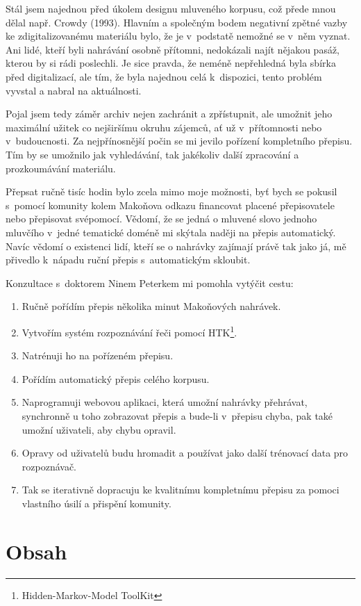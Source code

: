 Stál jsem najednou před úkolem designu mluveného korpusu, což přede mnou dělal
např. Crowdy (1993)\cite{crowdy1993spoken}.
Hlavním a společným bodem negativní zpětné vazby ke zdigitalizovanému materiálu
bylo, že je v~podstatě nemožné se v~něm vyznat. Ani lidé, kteří byli nahrávání
osobně přítomni, nedokázali najít nějakou pasáž, kterou by si rádi poslechli. Je
sice pravda, že neméně nepřehledná byla sbírka před digitalizací, ale tím, že
byla najednou celá k~dispozici, tento problém vyvstal a nabral na aktuálnosti.

Pojal jsem tedy záměr archiv nejen zachránit a zpřístupnit, ale umožnit jeho
maximální užitek co nejširšímu okruhu zájemců, ať už v~přítomnosti nebo
v~budoucnosti. Za nejpřínosnější počin se mi jevilo pořízení kompletního
přepisu. Tím by se umožnilo jak vyhledávání, tak jakékoliv další zpracování a
prozkoumávání materiálu.

Přepsat ručně tisíc hodin bylo zcela mimo moje možnosti, byť bych se pokusil
s~pomocí komunity kolem Makoňova odkazu financovat placené přepisovatele nebo
přepisovat svépomocí. Vědomí, že se jedná o mluvené slovo jednoho mluvčího
v~jedné tematické doméně mi skýtala naději na přepis automatický. Navíc vědomí o
existenci lidí, kteří se o nahrávky zajímají právě tak jako já, mě přivedlo
k~nápadu ruční přepis s~automatickým skloubit.

Konzultace s~doktorem Ninem Peterkem mi pomohla vytýčit cestu:
\begin{enumerate}
\item{Ručně pořídím přepis několika minut Makoňových nahrávek.}
\item{Vytvořím systém rozpoznávání řeči pomocí HTK\footnote{Hidden-Markov-Model
ToolKit}.}
\item{Natrénuji ho na pořízeném přepisu.}
\item{Pořídím automatický přepis celého korpusu.}
\item{Naprogramuji webovou aplikaci, která umožní nahrávky přehrávat,
synchronně u toho zobrazovat přepis a bude-li v~přepisu chyba, pak také umožní
uživateli, aby chybu opravil.}
\item{Opravy od uživatelů budu hromadit a používat jako další trénovací data pro
rozpoznávač.}
\item{Tak se iterativně dopracuju ke kvalitnímu kompletnímu přepisu za pomoci
vlastního úsilí a přispění komunity.}
\end{enumerate}

\section{Obsah}

